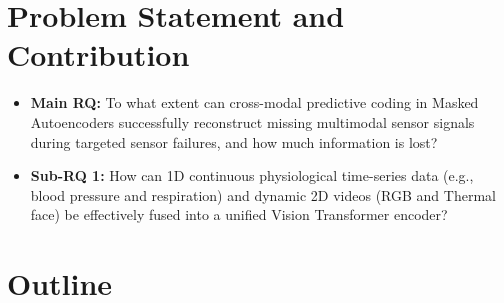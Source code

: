 \section{Problem Statement and Contribution}

\begin{itemize}
    \item \textbf{Main RQ:} To what extent can cross-modal predictive coding in Masked Autoencoders successfully reconstruct missing multimodal sensor signals during targeted sensor failures, and how much information is lost?
    
    \item \textbf{Sub-RQ 1:} How can 1D continuous physiological time-series data (e.g., blood pressure and respiration) and dynamic 2D videos (RGB and Thermal face) be effectively fused into a unified Vision Transformer encoder?
\end{itemize}

\section{Outline}

